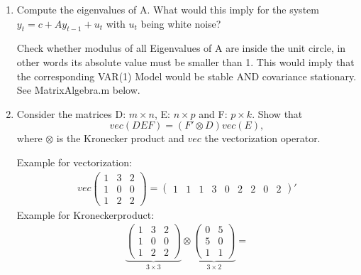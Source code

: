 \documentclass[a4paper]{scrartcl}
\begin{document}
\begin{enumerate}
	\item Compute the eigenvalues of A. What would this imply for the system $y_t = c + A y_{t-1} + u_t$ with $u_t$ being white noise?
	\begin{solution}
		Check whether modulus of all Eigenvalues of A are inside the unit circle, in other words its absolute value must be smaller than 1.
		This would imply that the corresponding VAR(1) Model would be stable AND covariance stationary. See MatrixAlgebra.m  below.
	\end{solution}

	\item Consider the matrices D: $m\times n$, E: $n\times p$ and F: $p\times k$. Show that $$vec(DEF)=\left(F'\otimes D\right) vec(E),$$ where $\otimes$ is the Kronecker product and $vec$ the vectorization operator.
	\begin{solution}
		Example for vectorization:
		\begin{align*}
		vec\begin{pmatrix} 1&3&2\\1&0&0\\1&2&2 \end{pmatrix} = \begin{pmatrix} 1 &1 &1 &3 &0&2&2&0&2\end{pmatrix}'
		\end{align*}
		Example for Kroneckerproduct:
		\begin{align*}
		\underbrace{\begin{pmatrix} 1&3&2\\1&0&0\\1&2&2 \end{pmatrix}}_{3\times3} \otimes \underbrace{\begin{pmatrix}0&5\\5&0\\1&1 \end{pmatrix}}_{3\times2} =

\end{align*}
\end{solution}
\end{enumerate}
\end{document}
